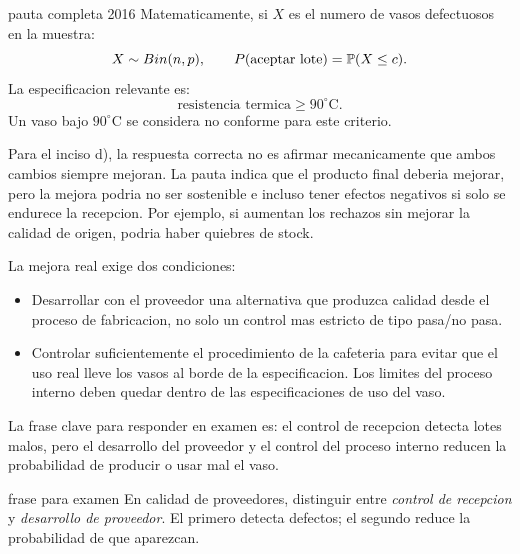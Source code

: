 \begin{pautacompleta}{pauta completa 2016}
Matematicamente, si $X$ es el numero de vasos defectuosos en la muestra:
\[
  X\sim Bin(n,p),
  \qquad
  P(\text{aceptar lote})=\mathbb{P}(X\le c).
\]
La especificacion relevante es:
\[
  \text{resistencia termica}\geq 90^\circ\text{C}.
\]
Un vaso bajo $90^\circ\text{C}$ se considera no conforme para este criterio.

Para el inciso d), la respuesta correcta no es afirmar mecanicamente que ambos cambios siempre mejoran. La pauta indica que el producto final deberia mejorar, pero la mejora podria no ser sostenible e incluso tener efectos negativos si solo se endurece la recepcion. Por ejemplo, si aumentan los rechazos sin mejorar la calidad de origen, podria haber quiebres de stock.

La mejora real exige dos condiciones:
\begin{itemize}
  \item Desarrollar con el proveedor una alternativa que produzca calidad desde el proceso de fabricacion, no solo un control mas estricto de tipo pasa/no pasa.
  \item Controlar suficientemente el procedimiento de la cafeteria para evitar que el uso real lleve los vasos al borde de la especificacion. Los limites del proceso interno deben quedar dentro de las especificaciones de uso del vaso.
\end{itemize}

La frase clave para responder en examen es: el control de recepcion detecta lotes malos, pero el desarrollo del proveedor y el control del proceso interno reducen la probabilidad de producir o usar mal el vaso.
\end{pautacompleta}

\begin{alerta}{frase para examen}
En calidad de proveedores, distinguir entre \emph{control de recepcion} y \emph{desarrollo de proveedor}. El primero detecta defectos; el segundo reduce la probabilidad de que aparezcan.
\end{alerta}
